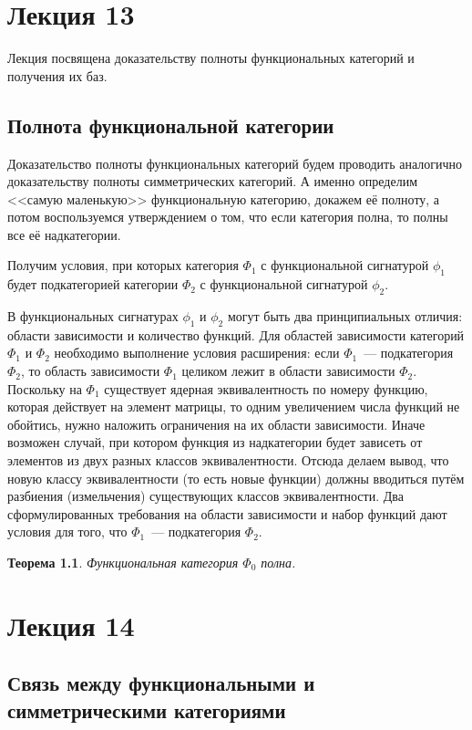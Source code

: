 \documentclass[a4paper, 12pt]{report}
\newtheorem{theorem}{Теорема}
\begin{document}
\chapter{Лекция 13}
Лекция посвящена доказательству полноты функциональных категорий и получения их баз.

\section{Полнота функциональной категории}
Доказательство полноты функциональных категорий будем проводить аналогично доказательству полноты симметрических категорий. А именно определим <<самую маленькую>> функциональную категорию, докажем её полноту, а потом воспользуемся утверждением о том, что если категория полна, то полны все её надкатегории. 

Получим условия, при которых категория $\Phi_1$ с функциональной сигнатурой $\phi_1$ будет подкатегорией категории $\Phi_2$ с функциональной сигнатурой $\phi_2$.

В функциональных сигнатурах $\phi_1$ и $\phi_2$ могут быть два принципиальных отличия: области зависимости и количество функций. Для областей зависимости категорий $\Phi_1$ и $\Phi_2$ необходимо выполнение условия расширения: если $\Phi_1$~--- подкатегория $\Phi_2$, то область зависимости $\Phi_1$ целиком лежит в области зависимости $\Phi_2$. Поскольку на $\Phi_1$ существует ядерная эквивалентность по номеру функцию, которая действует на элемент матрицы, то одним увеличением числа функций не обойтись, нужно наложить ограничения на их области зависимости. Иначе возможен случай, при котором функция из надкатегории будет зависеть от элементов из двух разных классов эквивалентности. Отсюда делаем вывод, что новую классу эквивалентности (то есть новые функции) должны вводиться путём разбиения (измельчения) существующих классов эквивалентности. Два сформулированных требования на области зависимости и набор функций дают условия для того, что $\Phi_1$~--- подкатегория $\Phi_2$.

\begin{theorem}
Функциональная категория $\Phi_0$ полна.
\end{theorem}  

\chapter{Лекция 14}
\section{Связь между функциональными и симметрическими категориями}
\end{document}
